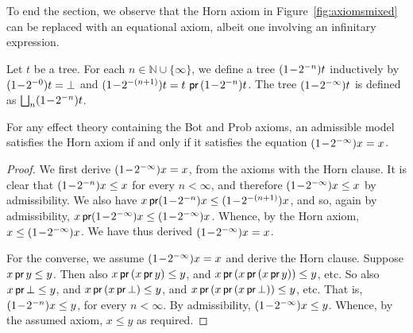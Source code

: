 To end the section, we observe that the Horn axiom in Figure~\ref{fig:axiomsmixed} can be replaced with an equational axiom, albeit one involving an infinitary expression.



\begin{definition}
    \label{def:probaApproxConstruct}
    Let $t$ be a  tree. For each $n \in \mathbb{N} \cup \{\infty\}$, we define a tree $\Iter{t}{n}$ inductively by
    $\Iter{t}{0} = \bot$ and $\Iter{t}{(n+1)}  = t\,  \prEff \,\Iter{t}{n}$. The
    tree $\Iter{t}{\infty}$ is defined as $\bigsqcup_n \Iter{t}{n}$.
\end{definition}

\begin{proposition}%
\label{proposition:horn}
    For any effect theory containing the Bot and Prob axioms, an admissible model satisfies the Horn axiom if and only if it satisfies the equation 
    $\Iterx{\infty}= x$.
\end{proposition}

\begin{proof} We first derive $\Iterx{\infty}= x$, from the axioms with the Horn clause.
    It is clear that $\Iterx{n} \leq  x$ for every $n < \infty$,
    and therefore $\Iterx{\infty} \leq  x$ by admissibility.
    We also have $x \prEff \Iterx{n} \leq  \Iterx{(n+1)}$,
    and so, again by admissibility, $x \prEff \Iterx{\infty} \leq \Iterx{\infty}$.
    Whence, by the Horn axiom, $x  \leq \Iterx{\infty}$. 
     We have thus derived $\Iterx{\infty}= x$.

    For the converse, we assume $\Iterx{\infty}= x$ and derive the Horn clause.
    Suppose $x \prEff y \leq y$.  Then also  $x \prEff \, (x \prEff y) \leq y$, and $x \prEff \, ( x \prEff \, (x \prEff y)) \leq y$, etc. So also $x \prEff \bot \leq y$, and $x \prEff \, (x \prEff \bot) \leq y$, and $x \prEff \, ( x \prEff \, (x \prEff \bot)) \leq y$,
 etc. That is, $\Iterx{n} \leq y$, for every $n < \infty$. By admissibility, $\Iterx{\infty} \leq y$. Whence, by the assumed axiom, $x \leq y$ as required.
 \end{proof}
